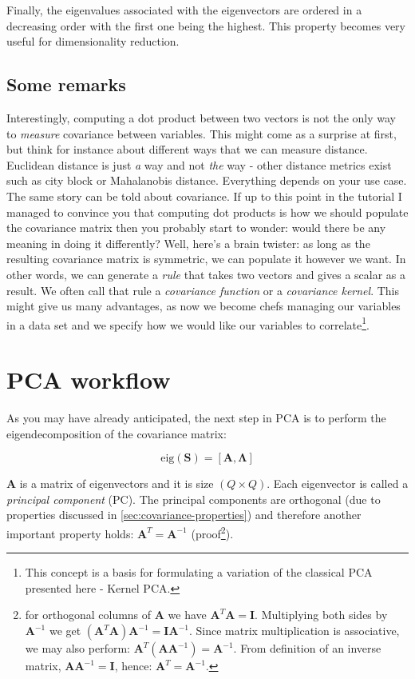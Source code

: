 \documentclass[10pt,twocolumn]{article}
\begin{document}
Finally, the eigenvalues associated with the eigenvectors are ordered in a decreasing order with the first one being the highest. This property becomes very useful for dimensionality reduction.

\subsection{Some remarks}

Interestingly, computing a dot product between two vectors is not the only way to \textit{measure} covariance between variables. This might come as a surprise at first, but think for instance about different ways that we can measure distance. Euclidean distance is just \textit{a} way and not \textit{the} way - other distance metrics exist such as city block or Mahalanobis distance. Everything depends on your use case. The same story can be told about covariance. If up to this point in the tutorial I managed to convince you that computing dot products is how we should populate the covariance matrix then you probably start to wonder: would there be any meaning in doing it differently? Well, here's a brain twister: as long as the resulting covariance matrix is symmetric, we can populate it however we want. In other words, we can generate a \textit{rule} that takes two vectors and gives a scalar as a result. We often call that rule a \textit{covariance function} or a \textit{covariance kernel}. This might give us many advantages, as now we become chefs managing our variables in a data set and we specify how we would like our variables to correlate\footnote{This concept is a basis for formulating a variation of the classical PCA presented here - Kernel PCA.}.


\section{PCA workflow}

As you may have already anticipated, the next step in PCA is to perform the eigendecomposition of the covariance matrix:

\begin{equation} \label{eq:eig-dec}
\text{eig}(\bm{S}) = [\bm{A}, \bm{\Lambda}]
\end{equation}



$\bm{A}$ is a matrix of eigenvectors and it is size $(Q \times Q)$. Each eigenvector is called a \textit{principal component} (PC). The principal components are orthogonal (due to properties discussed in \ref{sec:covariance-properties}) and therefore another important property holds: $\bm{A}^T = \bm{A}^{-1}$ (proof\footnote{for orthogonal columns of $\bm{A}$ we have $\bm{A}^T \bm{A} = \bm{I}$. Multiplying both sides by $\bm{A}^{-1}$ we get $(\bm{A}^T \bm{A}) \bm{A}^{-1}= \bm{I}\bm{A}^{-1}$. Since matrix multiplication is associative, we may also perform: $\bm{A}^T (\bm{A} \bm{A}^{-1}) = \bm{A}^{-1}$. From definition of an inverse matrix,  $\bm{A} \bm{A}^{-1} = \bm{I}$, hence: $\bm{A}^T = \bm{A}^{-1}$.}).
\end{document}

